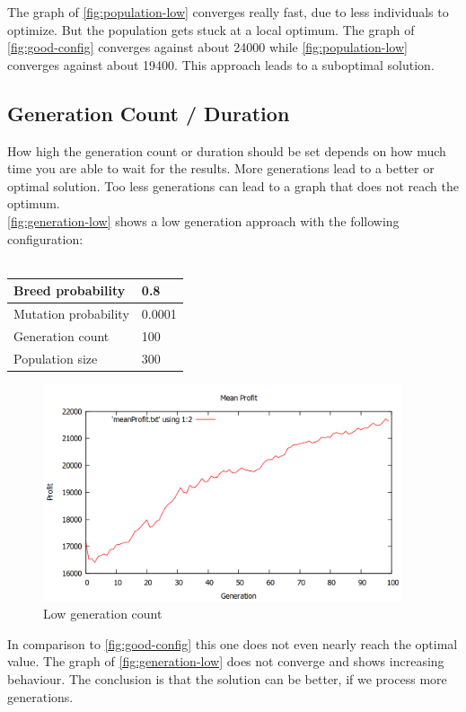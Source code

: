 \documentclass[fontsize=12pt,toc=bibliography, notitlepage]{scrreprt}
\begin{document}
The graph of \autoref{fig:population-low} converges really fast, due to less individuals to optimize. But the population gets stuck at a local optimum. The graph of \autoref{fig:good-config} converges against about 24000 while \autoref{fig:population-low} converges against about 19400. This approach leads to a suboptimal solution.

\subsection{Generation Count / Duration}
\label{subsec:algorithm-duration}
How high the generation count or duration should be set depends on how much time you are able to wait for the results. More generations lead to a better or optimal solution. Too less generations can lead to a graph that does not reach the optimum. \\
\autoref{fig:generation-low} shows a low generation approach with the following configuration: \\ \\
\begin{tabular}{ |l|l| }
	\hline
	Breed probability & 0.8 \\ \hline
	Mutation probability & 0.0001 \\ \hline
	Generation count & 100 \\ \hline
	Population size & 300 \\ \hline
\end{tabular}
\begin{figure}[H]
	\centering
	\includegraphics[width=400px]{images/generation-low.png}
	\caption{Low generation count}
	\label{fig:generation-low}
\end{figure}
In comparison to \autoref{fig:good-config} this one does not even nearly reach the optimal value. The graph of \autoref{fig:generation-low} does not converge and shows increasing behaviour. The conclusion is that the solution can be better, if we process more generations.
\end{document}
